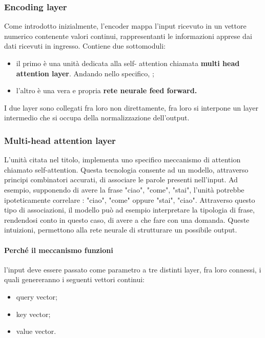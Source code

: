 \subsubsection{Encoding layer}
Come introdotto inizialmente, l'encoder mappa l'input ricevuto in un vettore numerico contenente valori continui, rappresentanti le informazioni apprese dai dati ricevuti in ingresso. Contiene due sottomoduli:
\begin{itemize}
	\item il primo è una unità dedicata alla self- attention chiamata \textbf{multi head attention layer}. Andando nello specifico, ;
	\item l'altro è una vera e propria \textbf{rete neurale feed forward. }
\end{itemize}
I due layer sono collegati fra loro non direttamente, fra loro si interpone un layer intermedio che si occupa della normalizzazione dell'output. 

\subsubsection{Multi-head attention layer}

L'unità citata nel titolo, implementa uno specifico meccanismo di attention chiamato self-attention. Questa tecnologia consente ad un modello, attraverso principi combinatori accurati, di associare le parole presenti nell'input. Ad esempio, supponendo di avere la frase {"ciao", "come", "stai"}, l'unità potrebbe ipoteticamente correlare : {"ciao", "come"} oppure {"stai", "ciao"}. Attraverso questo tipo di associazioni, il modello può ad esempio interpretare la tipologia di frase, rendendosi conto in questo caso, di avere a che fare con una domanda. Queste intuizioni, permettono alla rete neurale di strutturare un possibile output.

\paragraph{Perché il meccanismo funzioni} 
l'input deve essere passato come parametro a tre distinti layer, fra loro connessi, i quali genereranno i seguenti vettori continui:
\begin{itemize}
	\item query vector;
	\item key vector;
	\item value vector.
\end{itemize}

